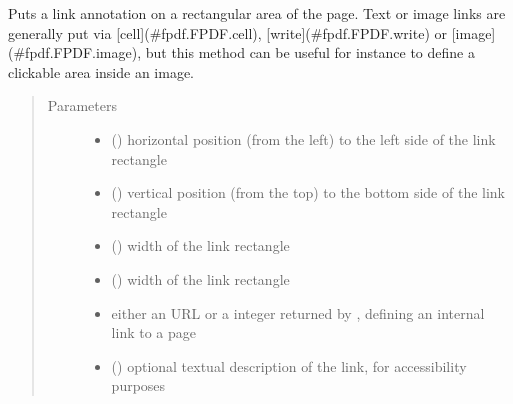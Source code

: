 \documentclass[letterpaper,10pt,english]{sphinxmanual}
\begin{document}
\begin{fulllineitems}
\begin{fulllineitems}
\label{\detokenize{generated/quality_assessment.quality_pdf_report.DefectReportPDF.link:quality_assessment.quality_pdf_report.DefectReportPDF.link}}
\sphinxAtStartPar
Puts a link annotation on a rectangular area of the page.
Text or image links are generally put via {[}cell{]}(\#fpdf.FPDF.cell),
{[}write{]}(\#fpdf.FPDF.write) or {[}image{]}(\#fpdf.FPDF.image),
but this method can be useful for instance to define a clickable area inside an image.
\begin{quote}\begin{description}
\item[{Parameters}] \leavevmode\begin{itemize}
\item {} 
\sphinxAtStartPar
{} () \textendash{} horizontal position (from the left) to the left side of the link rectangle

\item {} 
\sphinxAtStartPar
{} () \textendash{} vertical position (from the top) to the bottom side of the link rectangle

\item {} 
\sphinxAtStartPar
{} () \textendash{} width of the link rectangle

\item {} 
\sphinxAtStartPar
{} () \textendash{} width of the link rectangle

\item {} 
\sphinxAtStartPar
{} \textendash{} either an URL or a integer returned by , defining an internal link to a page

\item {} 
\sphinxAtStartPar
{} () \textendash{} optional textual description of the link, for accessibility purposes


\end{itemize}
\end{description}
\end{quote}
\end{fulllineitems}
\end{fulllineitems}
\end{document}
